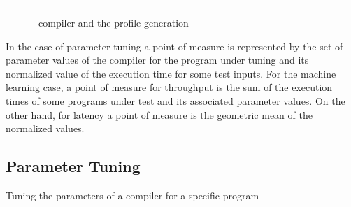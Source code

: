 \begin{figure}
  \centering
  
  \begin{minipage}[t]{\linewidth}
    \vspace{1em}
    \hrule
    \vspace{1em}
  \end{minipage}
  \caption{\CP\ compiler and the profile generation}
  \label{fig:CPview}
\end{figure}


In the case of parameter tuning a point of measure is represented by
the set of parameter values of the compiler for the program under tuning
and its normalized value of the execution time for some test inputs. For
the machine learning case, a point of measure for throughput is the sum
of the execution times of some programs under test and its associated
parameter values. On the other hand, for latency a point of measure is
the geometric mean of the normalized values.

\subsection{Parameter Tuning}

Tuning the parameters of a compiler for a specific program 